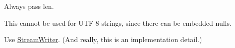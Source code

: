 \begin{DoxyRefList}
%
Always pass len.  
\item[Member \mbox{\hyperlink{class_json_1_1_value_iterator_base_a54765da6759fd3f1edcbfbaf308ec263}{Json\+::Value\+Iterator\+Base\+::member\+Name}} () const]\label{deprecated__deprecated000002}%
%
This cannot be used for UTF-\/8 strings, since there can be embedded nulls.  
\item[Class \mbox{\hyperlink{class_json_1_1_writer}{Json\+::Writer}} ]\label{deprecated__deprecated000007}%
%
Use \mbox{\hyperlink{class_json_1_1_stream_writer}{Stream\+Writer}}. (And really, this is an implementation detail.) 
\end{DoxyRefList}